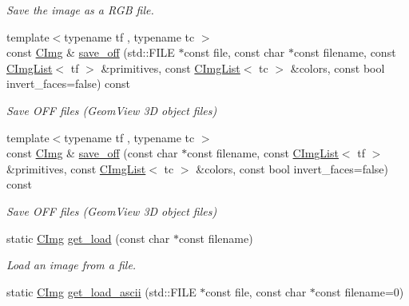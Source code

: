 \begin{DoxyCompactItemize}
\begin{DoxyCompactList}\small\item\em Save the image as a R\-G\-B file. \end{DoxyCompactList}\item 
\hypertarget{structcimg__library_1_1_c_img_ab969a669eb42be2895154c4859875de2}{{\footnotesize template$<$typename tf , typename tc $>$ }\\const \hyperlink{structcimg__library_1_1_c_img}{C\-Img} \& \hyperlink{structcimg__library_1_1_c_img_ab969a669eb42be2895154c4859875de2}{save\-\_\-off} (std\-::\-F\-I\-L\-E $\ast$const file, const char $\ast$const filename, const \hyperlink{structcimg__library_1_1_c_img_list}{C\-Img\-List}$<$ tf $>$ \&primitives, const \hyperlink{structcimg__library_1_1_c_img_list}{C\-Img\-List}$<$ tc $>$ \&colors, const bool invert\-\_\-faces=false) const }\label{structcimg__library_1_1_c_img_ab969a669eb42be2895154c4859875de2}

\begin{DoxyCompactList}\small\item\em Save O\-F\-F files (Geom\-View 3\-D object files) \end{DoxyCompactList}\item 
\hypertarget{structcimg__library_1_1_c_img_a7f5bcf80d1d42599aa1e80ec836f38b3}{{\footnotesize template$<$typename tf , typename tc $>$ }\\const \hyperlink{structcimg__library_1_1_c_img}{C\-Img} \& \hyperlink{structcimg__library_1_1_c_img_a7f5bcf80d1d42599aa1e80ec836f38b3}{save\-\_\-off} (const char $\ast$const filename, const \hyperlink{structcimg__library_1_1_c_img_list}{C\-Img\-List}$<$ tf $>$ \&primitives, const \hyperlink{structcimg__library_1_1_c_img_list}{C\-Img\-List}$<$ tc $>$ \&colors, const bool invert\-\_\-faces=false) const }\label{structcimg__library_1_1_c_img_a7f5bcf80d1d42599aa1e80ec836f38b3}

\begin{DoxyCompactList}\small\item\em Save O\-F\-F files (Geom\-View 3\-D object files) \end{DoxyCompactList}\item 
static \hyperlink{structcimg__library_1_1_c_img}{C\-Img} \hyperlink{structcimg__library_1_1_c_img_a33611f3d14a83d92bb29259f14515381}{get\-\_\-load} (const char $\ast$const filename)
\begin{DoxyCompactList}\small\item\em Load an image from a file. \end{DoxyCompactList}\item 
\hypertarget{structcimg__library_1_1_c_img_a3428f57c969dc72aa6efd8f2d8b51db6}{static \hyperlink{structcimg__library_1_1_c_img}{C\-Img} \hyperlink{structcimg__library_1_1_c_img_a3428f57c969dc72aa6efd8f2d8b51db6}{get\-\_\-load\-\_\-ascii} (std\-::\-F\-I\-L\-E $\ast$const file, const char $\ast$const filename=0)}\label{structcimg__library_1_1_c_img_a3428f57c969dc72aa6efd8f2d8b51db6}


\end{DoxyCompactItemize}

